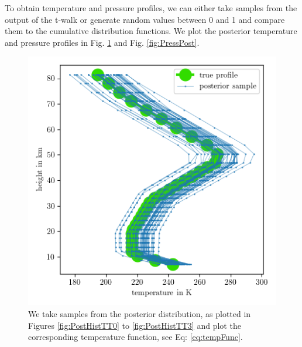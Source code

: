To obtain temperature and pressure profiles, we can either take samples from the output of the t-walk or generate random values between 0 and 1 and compare them to the cumulative distribution functions.
We plot the posterior temperature and pressure profiles in Fig. \ref{fig:TempPost} and Fig. \ref{fig:PressPost}.
\begin{figure}[ht!]
	\centering
	\includegraphics{TempPostMeanSigm.png} 
	\caption[Temperature posterior samples.]{We take samples from the posterior distribution, as plotted in Figures \ref{fig:PostHistTT0} to \ref{fig:PostHistTT3} and plot the corresponding temperature function, see Eq: \ref{eq:tempFunc}. }
	\label{fig:TempPost}
\end{figure}
\cleardoublepage
